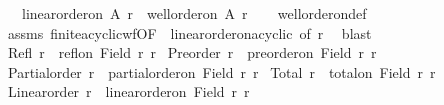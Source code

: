 \begin{isabellebody}
\ \ \ {\isachardoublequoteopen}linear{\isacharunderscore}{\kern0pt}order{\isacharunderscore}{\kern0pt}on\ A\ r\ {\isasymlongleftrightarrow}\ well{\isacharunderscore}{\kern0pt}order{\isacharunderscore}{\kern0pt}on\ A\ r{\isachardoublequoteclose}\isanewline
%
\isadelimproof
\ \ %
\endisadelimproof
%
\isatagproof
{}\isamarkupfalse%
\ well{\isacharunderscore}{\kern0pt}order{\isacharunderscore}{\kern0pt}on{\isacharunderscore}{\kern0pt}def\isanewline
\ \ \isamarkupfalse%
\ assms\ finite{\isacharunderscore}{\kern0pt}acyclic{\isacharunderscore}{\kern0pt}wf{\isacharbrackleft}{\kern0pt}OF\ {\isacharunderscore}{\kern0pt}\ linear{\isacharunderscore}{\kern0pt}order{\isacharunderscore}{\kern0pt}on{\isacharunderscore}{\kern0pt}acyclic{\isacharcomma}{\kern0pt}\ of\ r{\isacharbrackright}{\kern0pt}\ \isamarkupfalse%
\ blast%
\endisatagproof
{\isafoldproof}%
%
\isadelimproof
%
\endisadelimproof
%
\isadelimdocument
%
\endisadelimdocument
%
\isatagdocument
%
\isamarkuptrue%
%
\endisatagdocument
{\isafolddocument}%
%
\isadelimdocument
%
\endisadelimdocument
{}\isamarkupfalse%
\ {\isachardoublequoteopen}Refl\ r\ {\isasymequiv}\ refl{\isacharunderscore}{\kern0pt}on\ {\isacharparenleft}{\kern0pt}Field\ r{\isacharparenright}{\kern0pt}\ r{\isachardoublequoteclose}\isanewline
\isanewline
{}\isamarkupfalse%
\ {\isachardoublequoteopen}Preorder\ r\ {\isasymequiv}\ preorder{\isacharunderscore}{\kern0pt}on\ {\isacharparenleft}{\kern0pt}Field\ r{\isacharparenright}{\kern0pt}\ r{\isachardoublequoteclose}\isanewline
\isanewline
{}\isamarkupfalse%
\ {\isachardoublequoteopen}Partial{\isacharunderscore}{\kern0pt}order\ r\ {\isasymequiv}\ partial{\isacharunderscore}{\kern0pt}order{\isacharunderscore}{\kern0pt}on\ {\isacharparenleft}{\kern0pt}Field\ r{\isacharparenright}{\kern0pt}\ r{\isachardoublequoteclose}\isanewline
\isanewline
{}\isamarkupfalse%
\ {\isachardoublequoteopen}Total\ r\ {\isasymequiv}\ total{\isacharunderscore}{\kern0pt}on\ {\isacharparenleft}{\kern0pt}Field\ r{\isacharparenright}{\kern0pt}\ r{\isachardoublequoteclose}\isanewline
\isanewline
{}\isamarkupfalse%
\ {\isachardoublequoteopen}Linear{\isacharunderscore}{\kern0pt}order\ r\ {\isasymequiv}\ linear{\isacharunderscore}{\kern0pt}order{\isacharunderscore}{\kern0pt}on\ {\isacharparenleft}{\kern0pt}Field\ r{\isacharparenright}{\kern0pt}\ r{\isachardoublequoteclose}\isanewline
\isanewline
{}\isamarkupfalse%

\end{isabellebody}
